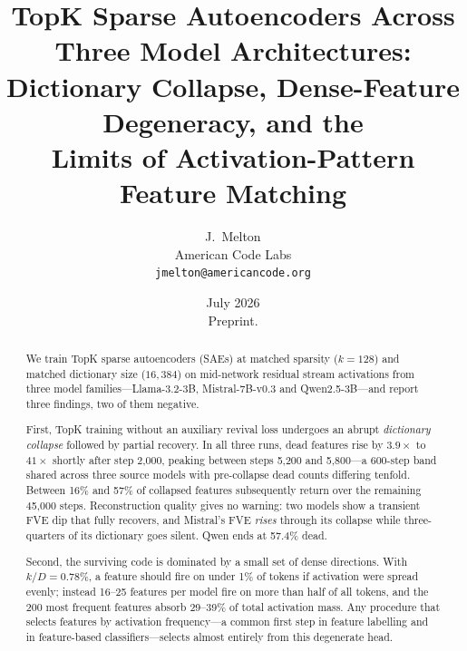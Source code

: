 \documentclass[11pt]{article}
\title{TopK Sparse Autoencoders Across Three Model Architectures:\\
Dictionary Collapse, Dense-Feature Degeneracy, and the\\
Limits of Activation-Pattern Feature Matching}
\author{J.~Melton \\
  American Code Labs \\
  \texttt{jmelton@americancode.org}}
\date{July 2026 \\ \smallskip \small Preprint.}
\begin{document}
\maketitle

\begin{abstract}
We train TopK sparse autoencoders (SAEs) at matched sparsity ($k = 128$) and matched
dictionary size ($16{,}384$) on mid-network residual stream activations from three
model families---Llama-3.2-3B, Mistral-7B-v0.3 and Qwen2.5-3B---and report three
findings, two of them negative.

First, TopK training without an auxiliary revival loss undergoes an abrupt
\emph{dictionary collapse} followed by partial recovery. In all three runs, dead
features rise by $3.9\times$ to $41\times$ shortly after step 2,000, peaking between
steps 5,200 and 5,800---a 600-step band shared across three source models with
pre-collapse dead counts differing tenfold. Between 16\% and 57\% of collapsed features
subsequently return over the remaining 45,000 steps. Reconstruction quality gives no
warning: two models show a transient FVE dip that fully recovers, and Mistral's FVE
\emph{rises} through its collapse while three-quarters of its dictionary goes silent.
Qwen ends at 57.4\% dead.

Second, the surviving code is dominated by a small set of dense directions. With
$k/D = 0.78\%$, a feature should fire on under 1\% of tokens if activation were spread
evenly; instead 16--25 features per model fire on more than half of all tokens, and the
200 most frequent features absorb 29--39\% of total activation mass. Any procedure that
selects features by activation frequency---a common first step in feature labelling and
in feature-based classifiers---selects almost entirely from this degenerate head.


\end{abstract}
\end{document}
